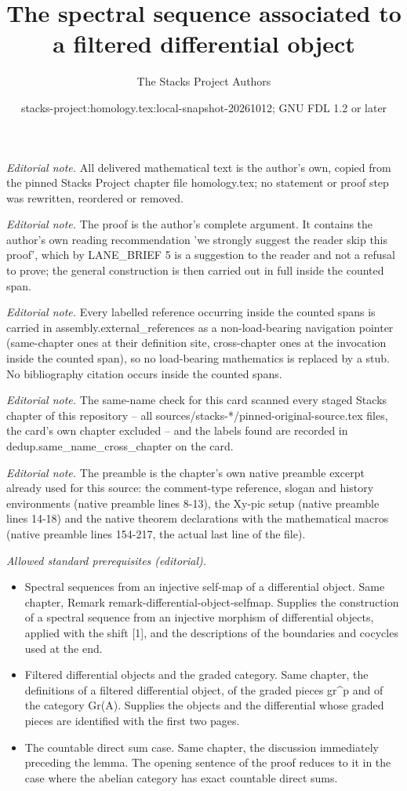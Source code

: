 \documentclass[10pt,a4paper]{amsart}
\title{The spectral sequence associated to a filtered differential object}
\author{The Stacks Project Authors}
\date{stacks-project:homology.tex:local-snapshot-20261012; GNU FDL 1.2 or later}
\theoremstyle{plain}
\theoremstyle{definition}
\theoremstyle{remark}
\numberwithin{equation}{subsection}
\begin{document}
\maketitle
\noindent\textit{Editorial note.} All delivered mathematical text is the author's own, copied from the pinned Stacks Project chapter file homology.tex; no statement or proof step was rewritten, reordered or removed.\par\medskip
\noindent\textit{Editorial note.} The proof is the author's complete argument. It contains the author's own reading recommendation 'we strongly suggest the reader skip this proof', which by LANE\_BRIEF 5 is a suggestion to the reader and not a refusal to prove; the general construction is then carried out in full inside the counted span.\par\medskip
\noindent\textit{Editorial note.} Every labelled reference occurring inside the counted spans is carried in assembly.external\_references as a non-load-bearing navigation pointer (same-chapter ones at their definition site, cross-chapter ones at the invocation inside the counted span), so no load-bearing mathematics is replaced by a stub. No bibliography citation occurs inside the counted spans.\par\medskip
\noindent\textit{Editorial note.} The same-name check for this card scanned every staged Stacks chapter of this repository -- all sources/stacks-*/pinned-original-source.tex files, the card's own chapter excluded -- and the labels found are recorded in dedup.same\_name\_cross\_chapter on the card.\par\medskip
\noindent\textit{Editorial note.} The preamble is the chapter's own native preamble excerpt already used for this source: the comment-type reference, slogan and history environments (native preamble lines 8-13), the Xy-pic setup (native preamble lines 14-18) and the native theorem declarations with the mathematical macros (native preamble lines 154-217, the actual last line of the file).\par\medskip
\noindent\textit{Allowed standard prerequisites (editorial).}\begin{itemize}
\item Spectral sequences from an injective self-map of a differential object. Same chapter, Remark remark-differential-object-selfmap. Supplies the construction of a spectral sequence from an injective morphism of differential objects, applied with the shift [1], and the descriptions of the boundaries and cocycles used at the end.
\item Filtered differential objects and the graded category. Same chapter, the definitions of a filtered differential object, of the graded pieces gr\textasciicircum{}p and of the category Gr(A). Supplies the objects and the differential whose graded pieces are identified with the first two pages.
\item The countable direct sum case. Same chapter, the discussion immediately preceding the lemma. The opening sentence of the proof reduces to it in the case where the abelian category has exact countable direct sums.
\end{itemize}\medskip
\end{document}
